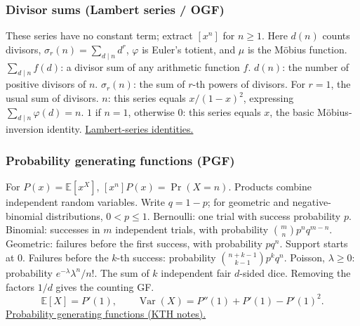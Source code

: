 \subsubsection*{Divisor sums (Lambert series / OGF)}
These series have no constant term; extract $[x^n]$ for $n\ge1$.
Here $d(n)$ counts divisors, $\sigma_r(n)=\sum_{d\mid n}d^r$,
$\varphi$ is Euler's totient, and $\mu$ is the M\"obius function.
  {$\sum_{d\mid n}f(d)$: a divisor sum of any arithmetic function $f$.}
  {$d(n)$: the number of positive divisors of $n$.}
  {$\sigma_r(n)$: the sum of $r$-th powers of divisors. For $r=1$, the usual sum of divisors.}
  {$n$: this series equals $x/(1-x)^2$, expressing $\sum_{d\mid n}\varphi(d)=n$.}
  {$1$ if $n=1$, otherwise $0$: this series equals $x$, the basic M\"obius-inversion identity.}
\href{https://dlmf.nist.gov/27.7}{Lambert-series identities.}

\subsubsection*{Probability generating functions (PGF)}
For $P(x)=\mathbb E[x^X]$, $[x^n]P(x)=\Pr(X=n)$.
Products combine independent random variables. Write $q=1-p$;
for geometric and negative-binomial distributions, $0<p\le1$.
  {Bernoulli: one trial with success probability $p$.}
  {Binomial: successes in $m$ independent trials, with probability $\binom{m}{n}p^nq^{m-n}$.}
  {Geometric: failures before the first success, with probability $pq^n$. Support starts at $0$.}
  {Failures before the $k$-th success: probability $\binom{n+k-1}{k-1}p^kq^n$.}
  {Poisson, $\lambda\ge0$: probability $e^{-\lambda}\lambda^n/n!$.}
  {The sum of $k$ independent fair $d$-sided dice. Removing the factors $1/d$ gives the counting GF.}
\[
  \mathbb E[X]=P'(1),\qquad
  \operatorname{Var}(X)=P''(1)+P'(1)-P'(1)^2.
\]
\href{https://www.math.kth.se/matstat/gru/sf2940/lectnotemat5.pdf}{Probability generating functions (KTH notes).}

